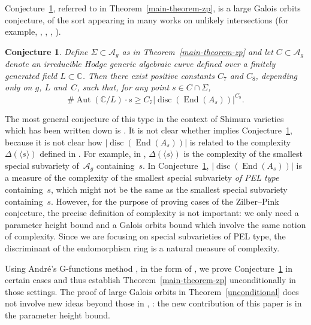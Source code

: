 \documentclass[11pt]{article}
\numberwithin{equation}{section}
\newcommand{\bC}{\mathbb{C}}
\newcommand{\cA}{\mathcal{A}}
\newcommand{\Ag}{\mathcal{A}_g}
\DeclareMathOperator{\Aut}{Aut}
\DeclareMathOperator{\disc}{disc}
\DeclareMathOperator{\End}{End}
\newcommand{\abs}[1]{\lvert #1 \rvert}
\newtheorem{conjecture}[lemma]{Conjecture}
\begin{document}
Conjecture~\ref{galois-orbits}, referred to in Theorem~\ref{main-theorem-zp}, is a large Galois orbits conjecture, of the sort appearing in many works on unlikely intersections (for example, \cite[Conj.\,2.7]{Ull14}, \cite[Conj.\,8.2]{HP16}, \cite[Conj.\,11.1]{DR18}, \cite[Conj.\,6.2]{QRTUI}).

\begin{conjecture} \label{galois-orbits}
Define $\Sigma \subset \Ag$ as in Theorem~\ref{main-theorem-zp} and let $C\subset\cA_g$ denote an irreducible Hodge generic algebraic curve defined over a finitely generated field $L \subset \bC$.
Then there exist positive constants $C_{7}$ and $C_{8}$, depending only on $g$, $L$ and~$C$, such that, for any point $s \in C \cap \Sigma$,
\[
\# \Aut(\bC/L) \cdot s \geq C_{7} \abs{\disc(\End(A_s))}^{C_{8}}.
\]
\end{conjecture}

The most general conjecture of this type in the context of Shimura varieties which has been written down is \cite[Conj.\,11.1]{DR18}.
It is not clear whether \cite[Conj.\,11.1]{DR18} implies Conjecture~\ref{galois-orbits}, because it is not clear how $\abs{\disc(\End(A_s))}$ is related to the complexity $\Delta(\langle s \rangle)$ defined in \cite{DR18}.
For example, in \cite[Conj.\,11.1]{DR18}, $\Delta(\langle s \rangle)$ is the complexity of the smallest special subvariety of~$\Ag$ containing~$s$.
In Conjecture~\ref{galois-orbits}, $\abs{\disc(\End(A_s))}$ is a measure of the complexity of the smallest special subvariety \textit{of PEL type} containing~$s$, which might not be the same as the smallest special subvariety containing~$s$.
However, for the purpose of proving cases of the Zilber--Pink conjecture, the precise definition of complexity is not important: we only need a parameter height bound and a Galois orbits bound which involve the same notion of complexity. Since we are focusing on special subvarieties of PEL type, the discriminant of the endomorphism ring is a natural measure of complexity.

Using André's G-functions method \cite{And89}, in the form of \cite[Th.\,8.2]{ExCM}, we prove Conjecture~\ref{galois-orbits} in certain cases and thus establish Theorem~\ref{main-theorem-zp} unconditionally in those settings.
The proof of large Galois orbits in Theorem~\ref{unconditional} does not involve new ideas beyond those in \cite{ExCM}, \cite{QRTUI}: the new contribution of this paper is in the parameter height bound.
\end{document}
